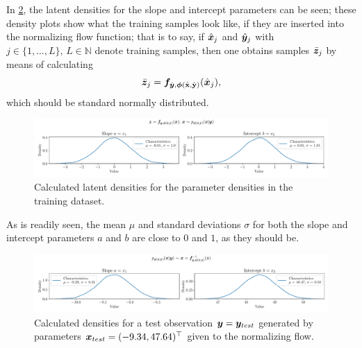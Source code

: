 \documentclass[a4paper,12pt]{report}
\begin{document}
In \cref{fig:nf-linear-regression-example-calctargetdensities}, the latent densities for the slope and intercept parameters can be seen; these density plots show what the training samples look like, if they are inserted into the normalizing flow function; that is to say, if $\hat{\bm{x}}_{j}$ and $\hat{\bm{y}}_j$ with $j \in \{1,\dots,L\},\,L \in \mathbb{N}$ denote training samples, then one obtains samples $\bar{\bm{z}}_{j}$ by means of calculating \begin{equation}
\bar{\bm{z}}_{j} = \bm{f}_{\hat{\bm{y}},\bm{\phi}(\hat{\boldsymbol{\mathbf{x}}},\hat{\boldsymbol{\mathbf{y}}})}(\hat{\bm{x}}_{j}),
\end{equation} which should be standard normally distributed.
\begin{figure}[h!]
\centering
\includegraphics[width=\textwidth]{figures/nf-linear-regression-example-calcbasedensities.pdf}
\caption{Calculated latent densities for the parameter densities in the training dataset.}
\label{fig:nf-linear-regression-example-calcbasedensities}
\end{figure}
As is readily seen, the mean $\mu$ and standard deviations $\sigma$ for both the slope and intercept parameters $a$ and $b$ are close to $0$ and $1$, as they should be.
\begin{figure}[h!]
\centering
\includegraphics[width=\textwidth]{figures/nf-linear-regression-example-calctargetdensities.pdf}
\caption{Calculated densities for a test observation $\bm{y} = \bm{y}_{test}$ generated by parameters $\bm{x}_{test} = (-9.34, 47.64)^\top$ given to the normalizing flow.}
\label{fig:nf-linear-regression-example-calctargetdensities}
\end{figure}
\end{document}
